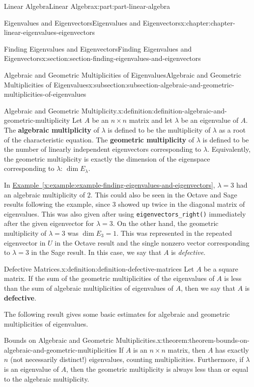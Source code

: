 \documentclass[twoside,10pt,]{book}
\newcommand{\xreffont}{\relax}
\newcommand{\mono}[1]{\texttt{#1}}
\newcommand{\terminology}[1]{\textbf{#1}}
\numberwithin{equation}{part}
\begin{document}
\begin{partptx}{Linear Algebra}{}{Linear Algebra}{}{}{x:part:part-linear-algebra}
\begin{chapterptx}{Eigenvalues and Eigenvectors}{}{Eigenvalues and Eigenvectors}{}{}{x:chapter:chapter-linear-eigenvalues-eigenvectors}
\begin{sectionptx}{Finding Eigenvalues and Eigenvectors}{}{Finding Eigenvalues and Eigenvectors}{}{}{x:section:section-finding-eigenvalues-and-eigenvectors}
\begin{subsectionptx}{Algebraic and Geometric Multiplicities of Eigenvalues}{}{Algebraic and Geometric Multiplicities of Eigenvalues}{}{}{x:subsection:subsection-algebraic-and-geometric-multiplicities-of-eigenvalues}
\begin{definition}{Algebraic and Geometric Multiplicity.}{x:definition:definition-algebraic-and-geometric-multiplicity}
Let \(A\) be an \(n\times n\) matrix and let \(\lambda\) be an eigenvalue of \(A\). The \terminology{algebraic multiplicity} of \(\lambda\) is defined to be the multiplicity of \(\lambda\) as a root of the characteristic equation. The \terminology{geometric multiplicity} of \(\lambda\) is defined to be the number of linearly independent eigenvectors corresponding to \(\lambda\). Equivalently, the geometric multiplicity is exactly the dimension of the eigenspace corresponding to \(\lambda\): \(\dim E_{\lambda}\).%
\end{definition}
In \hyperref[x:example:example-finding-eigenvalues-and-eigenvectors]{Example~{\xreffont\ref{x:example:example-finding-eigenvalues-and-eigenvectors}}}, \(\lambda = 3\) had an algebraic multiplicity of \(2\). This could also be seen in the Octave and Sage results following the example, since \(3\) showed up twice in the diagonal matrix of eigenvalues. This was also given after using \mono{eigenvectors\_right()} immediately after the given eigenvector for \(\lambda  = 3\). On the other hand, the geometric multiplicity of \(\lambda = 3\) was \(\dim E_{3} = 1\). This was represented in the repeated eigenvector in \(U\) in the Octave result and the single nonzero vector corresponding to \(\lambda = 3\) in the Sage result. In this case, we say that \(A\) is \emph{defective}.%
\begin{definition}{Defective Matrices.}{x:definition:definition-defective-matrices}%
%
%
Let \(A\) be a square matrix. If the sum of the geometric multiplicities of the eigenvalues of \(A\) is less than the sum of algebraic multiplicities of eigenvalues of \(A\), then we say that \(A\) is \terminology{defective}.%
\end{definition}
The following result gives some basic estimates for algebraic and geometric multiplicities of eigenvalues.%
\begin{theorem}{Bounds on Algebraic and Geometric Multiplicities.}{}{x:theorem:theorem-bounds-on-algebraic-and-geometric-multiplicities}%
If \(A\) is an \(n\times n\) matrix, then \(A\) has exactly \(n\) (not necessarily distinct!) eigenvalues, counting multiplicities. Furthermore, if \(\lambda\) is an eigenvalue of \(A\), then the geometric multiplicity is always less than or equal to the algebraic multiplicity.%
\end{theorem}

\end{subsectionptx}
\end{sectionptx}
\end{chapterptx}
\end{partptx}
\end{document}
